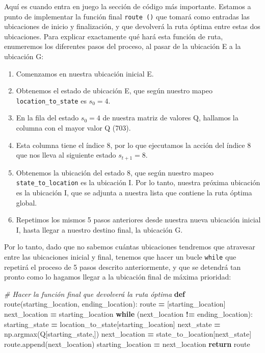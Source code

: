\documentclass[]{book}
\newenvironment{Shaded}{\begin{snugshade}}{\end{snugshade}}
\newcommand{\CommentTok}[1]{\textcolor[rgb]{0.56,0.35,0.01}{\textit{#1}}}
\newcommand{\ControlFlowTok}[1]{\textcolor[rgb]{0.13,0.29,0.53}{\textbf{#1}}}
\newcommand{\KeywordTok}[1]{\textcolor[rgb]{0.13,0.29,0.53}{\textbf{#1}}}
\newcommand{\NormalTok}[1]{#1}
\newcommand{\OperatorTok}[1]{\textcolor[rgb]{0.81,0.36,0.00}{\textbf{#1}}}
\providecommand{\tightlist}{%
  \setlength{\itemsep}{0pt}\setlength{\parskip}{0pt}}
\begin{document}
Aquí es cuando entra en juego la sección de código más importante. Estamos a punto de implementar la función final \texttt{route\ ()} que tomará como entradas las ubicaciones de inicio y finalización, y que devolverá la ruta óptima entre estas dos ubicaciones. Para explicar exactamente qué hará esta función de ruta, enumeremos los diferentes pasos del proceso, al pasar de la ubicación E a la ubicación G:

\begin{enumerate}
\def\labelenumi{\arabic{enumi}.}
\tightlist
\item
  Comenzamos en nuestra ubicación inicial E.
\item
  Obtenemos el estado de ubicación E, que según nuestro mapeo \texttt{location\_to\_state} es \(s_0 = 4\).
\item
  En la fila del estado \(s_0 = 4\) de nuestra matriz de valores Q, hallamos la columna con el mayor valor Q (703).
\item
  Esta columna tiene el índice 8, por lo que ejecutamos la acción del índice 8 que nos lleva al siguiente estado \(s_{t+1} = 8\).
\item
  Obtenemos la ubicación del estado 8, que según nuestro mapeo \texttt{state\_to\_location} es la ubicación I. Por lo tanto, nuestra próxima ubicación es la ubicación I, que se adjunta a nuestra lista que contiene la ruta óptima global.
\item
  Repetimos los mismos 5 pasos anteriores desde nuestra nueva ubicación inicial I, hasta llegar a nuestro destino final, la ubicación G.
\end{enumerate}

Por lo tanto, dado que no sabemos cuántas ubicaciones tendremos que atravesar entre las ubicaciones inicial y final, tenemos que hacer un bucle \texttt{while} que repetirá el proceso de 5 pasos descrito anteriormente, y que se detendrá tan pronto como lo hagamos llegar a la ubicación final de máxima prioridad:

\begin{Shaded}
\begin{Highlighting}[]
\CommentTok{# Hacer la función final que devolverá la ruta óptima}
\KeywordTok{def}\NormalTok{ route(starting_location, ending_location):}
\NormalTok{    route }\OperatorTok{=}\NormalTok{ [starting_location]}
\NormalTok{    next_location }\OperatorTok{=}\NormalTok{ starting_location}
    \ControlFlowTok{while}\NormalTok{ (next_location }\OperatorTok{!=}\NormalTok{ ending_location):}
\NormalTok{        starting_state }\OperatorTok{=}\NormalTok{ location_to_state[starting_location]}
\NormalTok{        next_state }\OperatorTok{=}\NormalTok{ np.argmax(Q[starting_state,])}
\NormalTok{        next_location }\OperatorTok{=}\NormalTok{ state_to_location[next_state]}
\NormalTok{        route.append(next_location)}
\NormalTok{        starting_location }\OperatorTok{=}\NormalTok{ next_location}
    \ControlFlowTok{return}\NormalTok{ route}
\end{Highlighting}
\end{Shaded}
\end{document}
